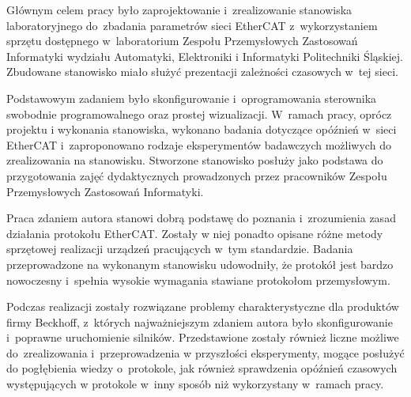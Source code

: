 Głównym celem pracy było zaprojektowanie i~zrealizowanie stanowiska laboratoryjnego do~zbadania parametrów sieci EtherCAT z~wykorzystaniem sprzętu dostępnego w~laboratorium Zespołu Przemysłowych Zastosowań Informatyki wydziału Automatyki, Elektroniki i Informatyki Politechniki Śląskiej. Zbudowane stanowisko miało służyć prezentacji zależności czasowych w~tej sieci.

Podstawowym zadaniem było  skonfigurowanie i~oprogramowania sterownika swobodnie programowalnego oraz prostej wizualizacji. W~ramach pracy, oprócz projektu i wykonania stanowiska, wykonano badania dotyczące opóźnień w~sieci EtherCAT i~zaproponowano rodzaje eksperymentów badawczych możliwych do zrealizowania na stanowisku.
Stworzone stanowisko posłuży jako podstawa do przygotowania zajęć dydaktycznych prowadzonych przez pracowników Zespołu Przemysłowych Zastosowań Informatyki.

Praca zdaniem autora stanowi dobrą podstawę do poznania i~zrozumienia zasad działania protokołu EtherCAT. Zostały w niej ponadto opisane różne metody sprzętowej realizacji urządzeń pracujących w~tym standardzie. 
Badania przeprowadzone na wykonanym stanowisku udowodniły, że protokół jest bardzo nowoczesny i~spełnia wysokie wymagania stawiane protokołom przemysłowym.

Podczas realizacji zostały rozwiązane problemy charakterystyczne dla produktów firmy Beckhoff, z~których najważniejszym zdaniem autora było skonfigurowanie i~poprawne uruchomienie silników. Przedstawione zostały również liczne możliwe do~zrealizowania i~przeprowadzenia w przyszłości eksperymenty, mogące posłużyć do pogłębienia wiedzy o~protokole, jak również sprawdzenia opóźnień czasowych występujących w protokole w~inny sposób niż wykorzystany w~ramach pracy.
\clearpage